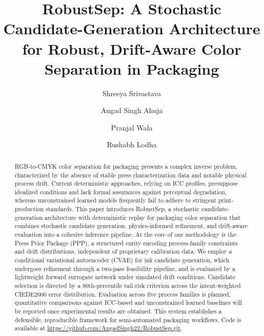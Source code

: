 \documentclass[acmsmall,screen,nonacm]{acmart}
\begin{document}
\title[RobustSep]{RobustSep: A Stochastic Candidate-Generation Architecture for Robust, Drift-Aware Color Separation in Packaging}

\author{Shreeya Srivastava}

\author{Angad Singh Ahuja}
\authornotemark[1]

\author{Pranjal Wala}
\authornotemark[1]

\author{Rushabh Lodha}

\renewcommand{\shortauthors}{Srivastava et al.}

\begin{abstract}
RGB-to-CMYK color separation for packaging presents a complex inverse problem, characterized by the absence of stable press characterization data and notable physical process drift. Current deterministic approaches, relying on ICC profiles, presuppose idealized conditions and lack formal assurances against perceptual degradation, whereas unconstrained learned models frequently fail to adhere to stringent print-production standards. This paper introduces RobustSep, a stochastic candidate-generation architecture with deterministic replay for packaging color separation that combines stochastic candidate generation, physics-informed refinement, and drift-aware evaluation into a cohesive inference pipeline. At the core of our methodology is the Press Prior Package (PPP), a structured entity encoding process-family constraints and drift distributions, independent of proprietary calibration data. We employ a conditional variational autoencoder (CVAE) for ink candidate generation, which undergoes refinement through a two-pass feasibility pipeline, and is evaluated by a lightweight forward surrogate network under simulated drift conditions. Candidate selection is directed by a 90th-percentile tail-risk criterion across the intent-weighted CIEDE2000 error distribution. Evaluation across five process families is planned; quantitative comparisons against ICC-based and unconstrained learned baselines will be reported once experimental results are obtained. This system establishes a defensible, reproducible framework for semi-automated packaging workflows. Code is available at \url{https://github.com/AngadSingh22/RobustSep.git}.
\end{abstract}
\end{document}
